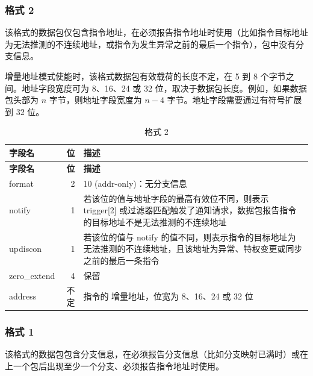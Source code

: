 \documentclass[main\_\_CN.tex]{subfiles}
\begin{document}
\subsubsection{格式 2}

该格式的数据包仅包含指令地址，在必须报告指令地址时使用（比如指令目标地址为无法推测的不连续地址，或指令为发生异常之前的最后一个指令），包中没有分支信息。

增量地址模式使能时，该格式数据包有效载荷的长度不定，在 5 到 8 个字节之间。地址字段宽度可为 8、16、24 或 32 位，取决于数据包长度。例如，如果数据包头部为 $n$ 字节，则地址字段宽度为 $n-4$ 字节。地址字段需要通过有符号扩展到 32 位。

\begin{longtable}[c]{ |l|r|L{10cm}| }
    \caption{格式 2}
    \label{tab:f2}
    \\\hline{}
    \textbf{字段名} & \textbf{位} & \textbf{描述} \\\hline
    \endfirsthead
    \hline
    \textbf{字段名} & \textbf{位} & \textbf{描述} \\\hline
    \endhead
    \endfoot
    \endlastfoot

    format & 2 & 10 (addr-only)：无分支信息 \\\hline
    notify & 1 & 若该位的值与地址字段的最高有效位不同，则表示 trigger[2] 或过滤器匹配触发了通知请求，数据包报告指令的目标地址不是无法推测的不连续地址 \\\hline
    updiscon & 1 & 若该位的值与 notify 的值不同，则表示指令的目标地址为无法推测的不连续地址，且该地址为异常、特权变更或同步之前的最后一条指令 \\\hline
    zero\_extend & 4 & 保留 \\\hline
    address & 不定 & 指令的 增量地址，位宽为 8、16、24 或 32 位 \\\hline
 \end{longtable}


\subsubsection{格式 1}

该格式的数据包包含分支信息，在必须报告分支信息（比如分支映射已满时）或在上一个包后出现至少一个分支、必须报告指令地址时使用。
\end{document}
